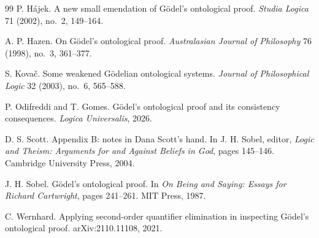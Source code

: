 \documentclass[11pt]{article}
\theoremstyle{plain}
\theoremstyle{definition}
\begin{document}
\begin{thebibliography}{99}
P. H\'ajek.
\newblock A new small emendation of G\"odel's ontological proof.
\newblock \emph{Studia Logica} 71 (2002), no.~2, 149--164.

A. P. Hazen.
\newblock On G\"odel's ontological proof.
\newblock \emph{Australasian Journal of Philosophy} 76 (1998), no.~3, 361--377.

S. Kova\v{c}.
\newblock Some weakened G\"odelian ontological systems.
\newblock \emph{Journal of Philosophical Logic} 32 (2003), no.~6, 565--588.

P. Odifreddi and T. Gomes.
\newblock G\"odel's ontological proof and its consistency consequences.
\newblock \emph{Logica Universalis}, 2026.

D. S. Scott.
\newblock Appendix B: notes in Dana Scott's hand.
\newblock In J. H. Sobel, editor, \emph{Logic and Theism: Arguments for and
  Against Beliefs in God}, pages 145--146. Cambridge University Press, 2004.

J. H. Sobel.
\newblock G\"odel's ontological proof.
\newblock In \emph{On Being and Saying: Essays for Richard Cartwright}, pages
  241--261. MIT Press, 1987.

C. Wernhard.
\newblock Applying second-order quantifier elimination in inspecting G\"odel's
  ontological proof.
\newblock arXiv:2110.11108, 2021.

\end{thebibliography}
\end{document}
